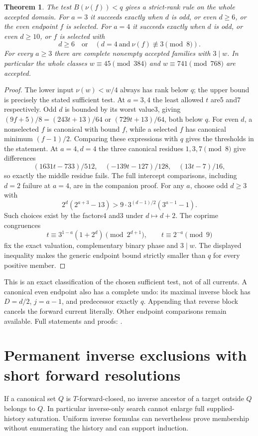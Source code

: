 \documentclass[11pt]{article}
\newtheorem{theorem}{Theorem}
\begin{document}
\begin{theorem}\label{thm:nonselectedforward}
The test $B(\nu(f))<q$ gives a strict-rank rule on the whole accepted
domain. For $a=3$ it succeeds exactly when $d$ is odd, or even $d\ge6$,
or the even endpoint $f$ is selected. For $a=4$ it succeeds exactly when
$d$ is odd, or even $d\ge10$, or $f$ is selected with
\[
 d\ge6\quad\text{or}\quad(d=4\ \text{and}\ \nu(f)\not\equiv3\pmod8).
\]
For every $a\ge3$ there are complete nonempty accepted families with
$3\mid w$. In particular the whole classes $w\equiv45\pmod{384}$
and $w\equiv741\pmod{768}$ are accepted.
\end{theorem}
\begin{proof}
The lower input $\nu(w)<w/4$ always has rank below $q$; the upper bound
is precisely the stated sufficient test. At $a=3,4$ the least allowed
$t$ are5 and7 respectively. Odd $d$ is bounded by its worst value3,
giving $(9f+5)/8=(243t+13)/64$ or $(729t+13)/64$, both below $q$.
For even $d$, a nonselected $f$ is canonical with bound $f$, while a
selected $f$ has canonical minimum $(f-1)/2$. Comparing these expressions
with $q$ gives the thresholds in the statement. At $a=4,d=4$ the three
canonical residues $1,3,7\pmod8$ give differences
\[
 (1631t-733)/512,\quad(-139t-127)/128,\quad(13t-7)/16,
\]
so exactly the middle residue fails. The full intercept comparisons,
including $d=2$ failure at $a=4$, are in the companion proof.
For any $a$, choose odd $d\ge3$ with
\[
 2^d(2^{a+3}-13)>9\cdot3^{(d-1)/2}(3^{a-1}-1).
\]
Such choices exist by the factors4 and3 under $d\mapsto d+2$.
The coprime congruences
\[
 t\equiv3^{1-a}(1+2^d)\pmod{2^{d+1}},\qquad
 t\equiv2^{-a}\pmod9
\]
fix the exact valuation, complementary binary phase and $3\mid w$.
The displayed inequality makes the generic endpoint bound strictly
smaller than $q$ for every positive member.
\end{proof}

This is an exact classification of the chosen sufficient test, not of
all currents. A canonical even endpoint also has a complete undo:
its maximal inverse block has $D=d/2$, $j=a-1$, and predecessor exactly
$q$. Appending that reverse block cancels the forward current literally.
Other endpoint comparisons remain available. Full statements and proofs:
.

\section{Permanent inverse exclusions with short forward resolutions}
If a canonical set $Q$ is $T$-forward-closed, no inverse ancestor of a
target outside $Q$ belongs to $Q$. In particular inverse-only search
cannot enlarge full supplied-history saturation. Uniform inverse formulas
can nevertheless prove membership without enumerating the history and
can support induction.
\end{document}
